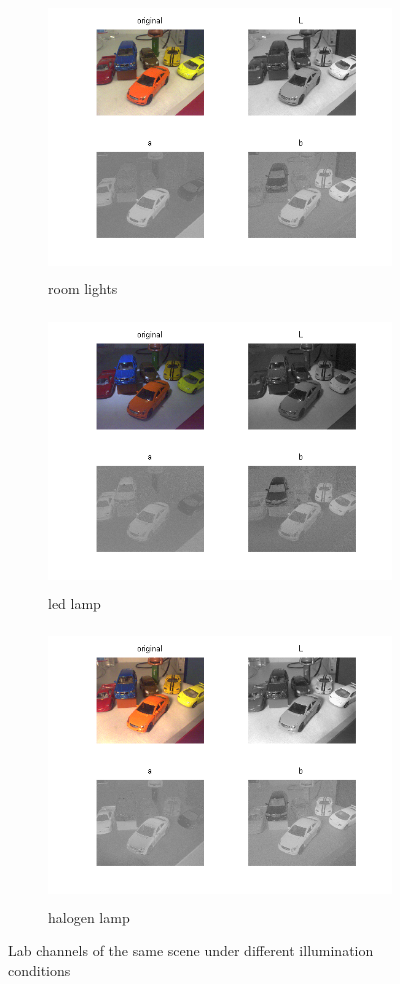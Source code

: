 \documentclass[
a4paper,     %
11pt         %
]{scrartcl}  %
\begin{document}
\newpage
\begin{figure}[ht!]
\centering
\begin{subfigure}{\textwidth}
  \centering
  \includegraphics[trim=60px 40px 60px 0, clip, height=7.3cm]{./Bildg_Messtechnik_Lab/ColorSpaces/html/main_03.png}
  \caption{room lights}
\end{subfigure}
\begin{subfigure}{\textwidth}
  \centering
  \includegraphics[trim=60px 40px 60px 0, clip, height=7.3cm]{./Bildg_Messtechnik_Lab/ColorSpaces/html/main_07.png}
  \caption{led lamp}
\end{subfigure}
\begin{subfigure}{\textwidth}
  \centering
  \includegraphics[trim=60px 40px 60px 0, clip, height=7.3cm]{./Bildg_Messtechnik_Lab/ColorSpaces/html/main_11.png}
  \caption{halogen lamp}
\end{subfigure}
\caption{Lab channels of the same scene under different illumination conditions}
\label{fig:colSpa_Lab}
\end{figure}
\end{document}
